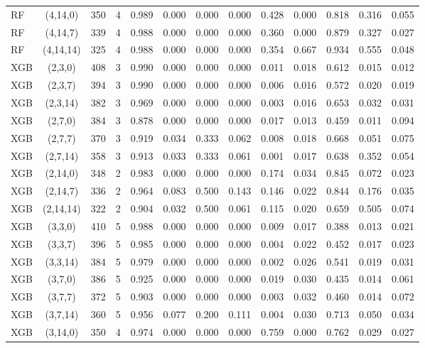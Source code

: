 \begin{longtable}{lcccccccccccc}
RF & (4,14,0) & 350 & 4 & 0.989 & 0.000 & 0.000 & 0.000 & 0.428 & 0.000 & 0.818 & 0.316 & 0.055 \\
RF & (4,14,7) & 339 & 4 & 0.988 & 0.000 & 0.000 & 0.000 & 0.360 & 0.000 & 0.879 & 0.327 & 0.027 \\
RF & (4,14,14) & 325 & 4 & 0.988 & 0.000 & 0.000 & 0.000 & 0.354 & 0.667 & 0.934 & 0.555 & 0.048 \\
XGB & (2,3,0) & 408 & 3 & 0.990 & 0.000 & 0.000 & 0.000 & 0.011 & 0.018 & 0.612 & 0.015 & 0.012 \\
XGB & (2,3,7) & 394 & 3 & 0.990 & 0.000 & 0.000 & 0.000 & 0.006 & 0.016 & 0.572 & 0.020 & 0.019 \\
XGB & (2,3,14) & 382 & 3 & 0.969 & 0.000 & 0.000 & 0.000 & 0.003 & 0.016 & 0.653 & 0.032 & 0.031 \\
XGB & (2,7,0) & 384 & 3 & 0.878 & 0.000 & 0.000 & 0.000 & 0.017 & 0.013 & 0.459 & 0.011 & 0.094 \\
XGB & (2,7,7) & 370 & 3 & 0.919 & 0.034 & 0.333 & 0.062 & 0.008 & 0.018 & 0.668 & 0.051 & 0.075 \\
XGB & (2,7,14) & 358 & 3 & 0.913 & 0.033 & 0.333 & 0.061 & 0.001 & 0.017 & 0.638 & 0.352 & 0.054 \\
XGB & (2,14,0) & 348 & 2 & 0.983 & 0.000 & 0.000 & 0.000 & 0.174 & 0.034 & 0.845 & 0.072 & 0.023 \\
XGB & (2,14,7) & 336 & 2 & 0.964 & 0.083 & 0.500 & 0.143 & 0.146 & 0.022 & 0.844 & 0.176 & 0.035 \\
XGB & (2,14,14) & 322 & 2 & 0.904 & 0.032 & 0.500 & 0.061 & 0.115 & 0.020 & 0.659 & 0.505 & 0.074 \\
XGB & (3,3,0) & 410 & 5 & 0.988 & 0.000 & 0.000 & 0.000 & 0.009 & 0.017 & 0.388 & 0.013 & 0.021 \\
XGB & (3,3,7) & 396 & 5 & 0.985 & 0.000 & 0.000 & 0.000 & 0.004 & 0.022 & 0.452 & 0.017 & 0.023 \\
XGB & (3,3,14) & 384 & 5 & 0.979 & 0.000 & 0.000 & 0.000 & 0.002 & 0.026 & 0.541 & 0.019 & 0.031 \\
XGB & (3,7,0) & 386 & 5 & 0.925 & 0.000 & 0.000 & 0.000 & 0.019 & 0.030 & 0.435 & 0.014 & 0.061 \\
XGB & (3,7,7) & 372 & 5 & 0.903 & 0.000 & 0.000 & 0.000 & 0.003 & 0.032 & 0.460 & 0.014 & 0.072 \\
XGB & (3,7,14) & 360 & 5 & 0.956 & 0.077 & 0.200 & 0.111 & 0.004 & 0.030 & 0.713 & 0.050 & 0.034 \\
XGB & (3,14,0) & 350 & 4 & 0.974 & 0.000 & 0.000 & 0.000 & 0.759 & 0.000 & 0.762 & 0.029 & 0.027 \\

\end{longtable}
